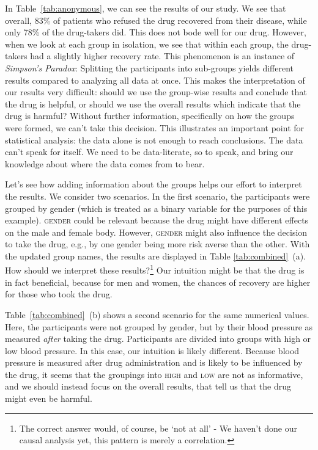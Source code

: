 \documentclass[nobib]{tufte-handout}
\begin{document}
In Table~\ref{tab:anonymous}, we can see the results of our study.
We see that overall, 83\% of patients who refused the drug recovered from their disease, while only 78\% of the drug-takers did. 
This does not bode well for our drug.
However, when we look at each group in isolation, we see that within each group, the drug-takers had a slightly higher recovery rate.
This phenomenon is an instance of \textit{Simpson's Paradox}: Splitting the participants into sub-groups yields different results compared to analyzing all data at once.
This makes the interpretation of our results very difficult: should we use the group-wise results and conclude that the drug is helpful, or should we use the overall results which indicate that the drug is harmful? 
Without further information, specifically on how the groups were formed, we can't take this decision.
This illustrates an important point for statistical analysis: the data alone is not enough to reach conclusions.
The data can't speak for itself. 
We need to be data-literate, so to speak, and bring our knowledge about where the data comes from to bear.

Let's see how adding information about the groups helps our effort to interpret the results. 
We consider two scenarios.
In the first scenario, the participants were grouped by gender (which is treated as a binary variable for the purposes of this example).
\textsc{gender} could be relevant because the drug might have different effects on the male and female body. 
However, \textsc{gender} might also influence the decision to take the drug, e.g., by one gender being more risk averse than the other. 
With the updated group names, the results are displayed in Table \ref{tab:combined}~(a).
How should we interpret these results?\footnote{The correct answer would, of course, be `not at all' - We haven't done our causal analysis yet, this pattern is merely a correlation.}
Our intuition might be that the drug is in fact beneficial, because for men and women, the chances of recovery are higher for those who took the drug.


Table~\ref{tab:combined}~(b) shows a second scenario for the same numerical values.
Here, the participants were not grouped by gender, but by their blood pressure as measured \textit{after} taking the drug.
Participants are divided into groups with high or low blood pressure. 
In this case, our intuition is likely different. 
Because blood pressure is measured after drug administration and is likely to be influenced by the drug, it seems that the groupings into \textsc{high} and \textsc{low} are not as informative, and we should instead focus on the overall results, that tell us that the drug might even be harmful.
\end{document}
